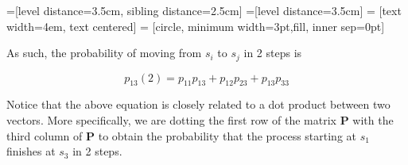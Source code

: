 \documentclass[a4paper, 12pt]{article}
\begin{document}
=[level distance=3.5cm, sibling distance=2.5cm]
=[level distance=3.5cm]
 = [text width=4em, text centered]
 = [circle, minimum width=3pt,fill, inner sep=0pt]
\begin{center}
\end{center}
	As such, the probability of moving from $s_i$ to $s_j$ in 2 steps is
	
	\[
	p_{13}(2) = p_{11}p_{13} + p_{12}p_{23} + p_{13}p_{33}
	\]
	
	Notice that the above equation is closely related to a dot product between two vectors. More specifically, we are dotting the first row of the matrix \textbf{P} with the third column of \textbf{P} to obtain the probability that the process starting at \emph{$s_1$} finishes at \emph{$s_3$} in 2 steps.\\
\end{document}
